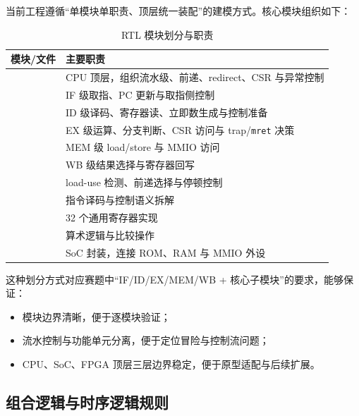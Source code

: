 当前工程遵循“单模块单职责、顶层统一装配”的建模方式。核心模块组织如下：
\begin{table}[H]
    \centering
    \small
    \caption{RTL 模块划分与职责}
    \begin{tabularx}{0.95\textwidth}{L{0.28\textwidth} Y}
        \toprule
        模块/文件 & 主要职责 \\
        \midrule
         & CPU 顶层，组织流水级、前递、redirect、CSR 与异常控制 \\
         & IF 级取指、PC 更新与取指侧控制 \\
         & ID 级译码、寄存器读、立即数生成与控制准备 \\
         & EX 级运算、分支判断、CSR 访问与 trap/\texttt{mret} 决策 \\
         & MEM 级 load/store 与 MMIO 访问 \\
         & WB 级结果选择与寄存器回写 \\
         & load-use 检测、前递选择与停顿控制 \\
         & 指令译码与控制语义拆解 \\
         & 32 个通用寄存器实现 \\
         & 算术逻辑与比较操作 \\
         & SoC 封装，连接 ROM、RAM 与 MMIO 外设 \\
        \bottomrule
    \end{tabularx}
\end{table}

这种划分方式对应赛题中“IF/ID/EX/MEM/WB + 核心子模块”的要求，能够保证：
\begin{itemize}
    \item 模块边界清晰，便于逐模块验证；
    \item 流水控制与功能单元分离，便于定位冒险与控制流问题；
    \item CPU、SoC、FPGA 顶层三层边界稳定，便于原型适配与后续扩展。
\end{itemize}

\subsection{组合逻辑与时序逻辑规则}


